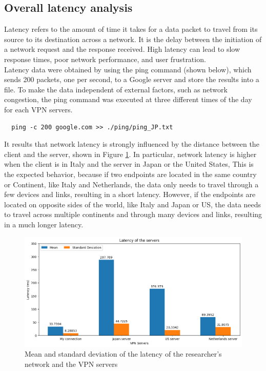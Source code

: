 \documentclass[eng]{class}
\begin{document}
\subsection{Overall latency analysis}
Latency refers to the amount of time it takes for a data packet to travel from its source to its destination across a network.
It is the delay between the initiation of a network request and the response received.
High latency can lead to slow response times, poor network performance, and user frustration.
\\Latency data were obtained by using the ping command (shown below), which sends 200 packets, one per second, to a Google server and store the results into a file.
To make the data independent of external factors, such as network congestion, the ping command was executed at three different times of the day for each VPN servers.
\begin{lstlisting}
  ping -c 200 google.com >> ./ping/ping_JP.txt
\end{lstlisting}
\noindent
It results that network latency is strongly influenced by the distance between the client and the server, shown in Figure \ref*{fig-1}.
In particular, network latency is higher when the client is in Italy and the server in Japan or the United States,
This is the expected behavior, because if two endpoints are located in the same country or Continent, like Italy and Netherlands, the data only needs to travel through a few devices and links, resulting in a short latency.
However, if the endpoints are located on opposite sides of the world, like Italy and Japan or US, the data needs to travel across multiple continents and through many devices and links,
resulting in a much longer latency.
\begin{figure}[H]
  \centering
  \includegraphics[width=.7\columnwidth]{images/ServerLatency.png}
  \caption{Mean and standard deviation of the latency of the researcher's network and the VPN servers}
  \label{fig-1}
\end{figure}
\end{document}
